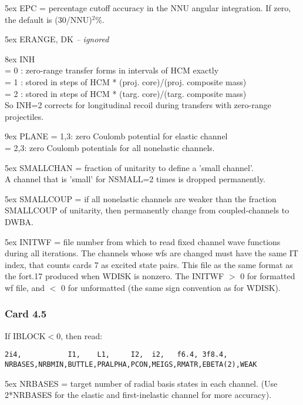 \documentclass[11pt]{article}
\begin{document}
\hangindent 5ex
EPC = percentage cutoff accuracy in the
NNU angular integration.
If zero, the default is (30/NNU)$^2$\%.

\hangindent 5ex
ERANGE, DK   {\em -- ignored}

\hangindent 8ex  INH
\\ = 0 : zero-range transfer forms in intervals of HCM exactly
\\ = 1 : stored in steps of HCM * (proj. core)/(proj. composite mass)
\\ = 2 : stored in steps of HCM * (targ. core)/(targ. composite mass)\\
    So INH=2 corrects for longitudinal recoil during transfers with zero-range projectiles.



\hangindent 9ex
PLANE = 1,3: zero Coulomb potential for elastic channel\\
      = 2,3: zero Coulomb potentials for all nonelastic channels.


\hangindent 5ex
SMALLCHAN = fraction of unitarity to define a 'small channel'.\\
A channel that is 'small' for NSMALL=2 times is dropped permanently.

\hangindent 5ex
SMALLCOUP = if all nonelastic channels are weaker than the fraction
SMALLCOUP of unitarity, then permanently change from coupled-channels to DWBA.

\hangindent 5ex
INITWF = file number from which to read fixed channel  wave functions during all iterations. The channels whose wfs are changed must have the same
IT  index, that counts cards 7 as excited state pairs.
This file as the same format as the fort.17 produced when WDISK is nonzero. 
The INITWF $>$ 0 for formatted wf file, and $<$ 0 for unformatted (the same sign convention as for WDISK).

\subsubsection*{Card 4.5}
If IBLOCK$<$0, then read:
\begin{verbatim}
2i4,           I1,    L1,     I2,  i2,   f6.4, 3f8.4,
NRBASES,NRBMIN,BUTTLE,PRALPHA,PCON,MEIGS,RMATR,EBETA(2),WEAK
\end{verbatim}


\hangindent 5ex
NRBASES = target number of radial basis states in each channel.
(Use 2*NRBASES for the elastic and first-inelastic channel for more accuracy).
\end{document}

